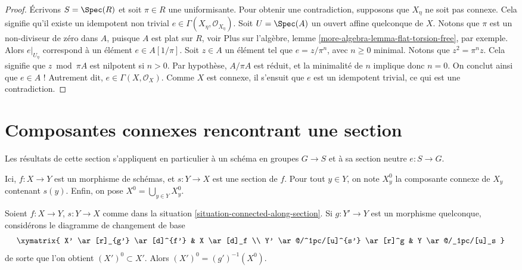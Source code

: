 \begin{proof}
Écrivons $S = \Spec(R)$ et soit $\pi \in R$ une uniformisante.
Pour obtenir une contradiction, supposons que $X_\eta$ ne soit pas connexe.
Cela signifie qu'il existe un idempotent non trivial
$e \in \Gamma(X_\eta, \mathcal{O}_{X_\eta})$.
Soit $U = \Spec(A)$ un ouvert affine quelconque de $X$.
Notons que $\pi$ est un non-diviseur de zéro dans $A$, puisque $A$ est plat sur $R$, voir
Plus sur l'algèbre, lemme \ref{more-algebra-lemma-flat-torsion-free},
par exemple. Alors $e|_{U_\eta}$ correspond à un élément $e \in A[1/\pi]$.
Soit $z \in A$ un élément tel que $e = z/\pi^n$, avec $n \geq 0$ minimal.
Notons que $z^2 = \pi^nz$. Cela signifie que $z \bmod \pi A$ est nilpotent
si $n > 0$. Par hypothèse, $A/\pi A$ est réduit, et la minimalité de
$n$ implique donc $n = 0$. On conclut ainsi que $e \in A$ ! Autrement dit,
$e \in \Gamma(X, \mathcal{O}_X)$. Comme $X$ est connexe, il s'ensuit
que $e$ est un idempotent trivial, ce qui est une contradiction.
\end{proof}

\section{Composantes connexes rencontrant une section}
\label{section-connected-components}

\noindent
Les résultats de cette section s'appliquent en particulier à un schéma en groupes
$G \to S$ et à sa section neutre $e : S \to G$.

\begin{situation}
\label{situation-connected-along-section}
Ici, $f : X \to Y$ est un morphisme de schémas, et
$s : Y \to X$ est une section de $f$.
Pour tout $y \in Y$, on note $X^0_y$ la composante connexe de $X_y$
contenant $s(y)$. Enfin, on pose $X^0 = \bigcup_{y \in Y} X^0_y$.
\end{situation}

\begin{lemma}
\label{lemma-base-change-connected-along-section}
Soient $f : X \to Y$, $s : Y \to X$ comme dans la
situation \ref{situation-connected-along-section}.
Si $g : Y' \to Y$ est un morphisme quelconque, considérons le diagramme de changement de base
$$
\xymatrix{
X' \ar[r]_{g'} \ar[d]^{f'} & X \ar[d]_f \\
Y' \ar@/^1pc/[u]^{s'} \ar[r]^g & Y \ar@/_1pc/[u]_s
}
$$
de sorte que l'on obtient $(X')^0 \subset X'$.
Alors $(X')^0 = (g')^{-1}(X^0)$.
\end{lemma}

